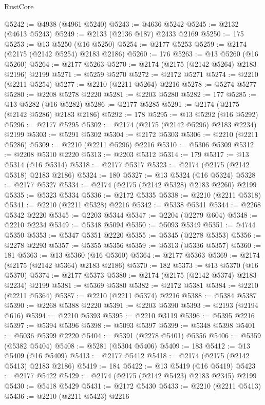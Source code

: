 \begin{lexlean}{RustCore}
\begin{coremodule}
@5242 := @4938 (@4961 @5240)
@5243 := @4636 @5242
@5245 := @2132 (@4613 @5243)
@5249 := @2133 (@2136 @187) @2433 @2169
@5250 := 175
@5253 := @13 @5250 (@16 @5250)
@5254 := @2177 @5253
@5259 := @2174 (@2175 (@2142 @5254) @2183 @2186)
@5260 := 176
@5263 := @13 @5260 (@16 @5260)
@5264 := @2177 @5263
@5270 := @2174 (@2175 (@2142 @5264) @2183 @2196) @2199
@5271 := @5259 @5270
@5272 := @2172 @5271
@5274 := @2210 (@2211 @5254)
@5277 := @2210 (@2211 @5264) @2216
@5278 := @5274 @5277
@5280 := @2208 @5278 @2220
@5281 := @2203 @5280
@5282 := 177
@5285 := @13 @5282 (@16 @5282)
@5286 := @2177 @5285
@5291 := @2174 (@2175 (@2142 @5286) @2183 @2186)
@5292 := 178
@5295 := @13 @5292 (@16 @5292)
@5296 := @2177 @5295
@5302 := @2174 (@2175 (@2142 @5296) @2183 @2234) @2199
@5303 := @5291 @5302
@5304 := @2172 @5303
@5306 := @2210 (@2211 @5286)
@5309 := @2210 (@2211 @5296) @2216
@5310 := @5306 @5309
@5312 := @2208 @5310 @2220
@5313 := @2203 @5312
@5314 := 179
@5317 := @13 @5314 (@16 @5314)
@5318 := @2177 @5317
@5323 := @2174 (@2175 (@2142 @5318) @2183 @2186)
@5324 := 180
@5327 := @13 @5324 (@16 @5324)
@5328 := @2177 @5327
@5334 := @2174 (@2175 (@2142 @5328) @2183 @2260) @2199
@5335 := @5323 @5334
@5336 := @2172 @5335
@5338 := @2210 (@2211 @5318)
@5341 := @2210 (@2211 @5328) @2216
@5342 := @5338 @5341
@5344 := @2268 @5342 @2220
@5345 := @2203 @5344
@5347 := @2204 (@2279 @604)
@5348 := @2210 @2234
@5349 := @5348 @5094
@5350 := @5093 @5349
@5351 := @4744 @5350
@5353 := @5347 @5351 @2220
@5355 := @5345 (@2278 @5353)
@5356 := @2278 @2293
@5357 := @5355 @5356
@5359 := @5313 (@5336 @5357)
@5360 := 181
@5363 := @13 @5360 (@16 @5360)
@5364 := @2177 @5363
@5369 := @2174 (@2175 (@2142 @5364) @2183 @2186)
@5370 := 182
@5373 := @13 @5370 (@16 @5370)
@5374 := @2177 @5373
@5380 := @2174 (@2175 (@2142 @5374) @2183 @2234) @2199
@5381 := @5369 @5380
@5382 := @2172 @5381
@5384 := @2210 (@2211 @5364)
@5387 := @2210 (@2211 @5374) @2216
@5388 := @5384 @5387
@5390 := @2268 @5388 @2220
@5391 := @2203 @5390
@5393 := @2193 (@2194 @616)
@5394 := @2210 @5393
@5395 := @2210 @3119
@5396 := @5395 @2216
@5397 := @5394 @5396
@5398 := @5093 @5397
@5399 := @5348 @5398
@5401 := @5036 @5399 @2220
@5404 := @5391 (@2278 @5401) @5356
@5406 := @5359 (@5382 @5404)
@5408 := @5281 (@5304 @5406)
@5409 := 183
@5412 := @13 @5409 (@16 @5409)
@5413 := @2177 @5412
@5418 := @2174 (@2175 (@2142 @5413) @2183 @2186)
@5419 := 184
@5422 := @13 @5419 (@16 @5419)
@5423 := @2177 @5422
@5429 := @2174 (@2175 (@2142 @5423) @2183 @2345) @2199
@5430 := @5418 @5429
@5431 := @2172 @5430
@5433 := @2210 (@2211 @5413)
@5436 := @2210 (@2211 @5423) @2216

\end{coremodule}
\end{lexlean}
